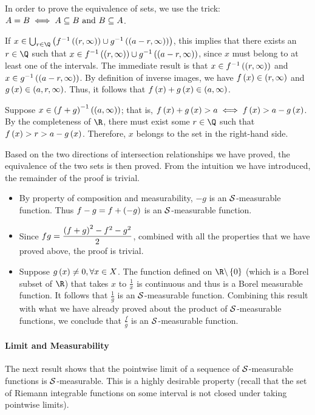 \documentclass[
]{article}
\begin{document}
In order to prove the equivalence of sets, we use the trick:
\(A= B\iff A\se B \text{ and }B\se A\).

If
\(x\in \bigcup_{r\in \Q}\pr{\inv f\pr{\pr{r,\infty}}\cup\inv g\pr{\pr{a-r,\infty}}}\),
this implies that there exists an \(r\in \Q\) such that
\(x\in\inv f\pr{\pr{r,\infty}}\cup\inv g\pr{\pr{a-r,\infty}}\), since
\(x\) must belong to at least one of the intervals. The immediate result
is that \(x\in \inv f\pr{\pr{r,\infty}}\) and
\(x\in \inv g\pr{\pr{a-r,\infty}}\). By definition of inverse images, we
have \(f\pr{x}\in \pr{r,\infty}\) and \(g\pr x\in \pr{a,r,\infty}\).
Thus, it follows that \(f\pr x+g\pr x\in \pr{a,\infty}\).

Suppose \(x\in \pr{f+g}^{-1}\pr{\pr{a,\infty}}\); that is,
\(f\pr x+g\pr x>a\iff f\pr x > a-g\pr x\). By the completeness of
\(\R\), there must exist some \(r\in \Q\) such that
\(f\pr{x}>r>a-g\pr x\). Therefore, \(x\) belongs to the set in the
right-hand side.

Based on the two directions of intersection relationships we have
proved, the equivalence of the two sets is then proved. From the
intuition we have introduced, the remainder of the proof is trivial.

\begin{itemize}
\item
  By property of composition and measurability, \(-g\) is an
  \(\S\)-measurable function. Thus \(f-g = f+\pr{-g}\) is an
  \(\S\)-measurable function.
\item
  Since \(fg = \dfrac{\pr{f+g}^2-f^2-g^2}{2}\), combined with all the
  properties that we have proved above, the proof is trivial.
\item
  Suppose \(g\pr{x}\ne 0,\forall x\in X\). The function defined on
  \(\R\c \brace{0}\) (which is a Borel subset of \(\R\)) that takes
  \(x\) to \(\frac1x\) is continuous and thus is a Borel measurable
  function. It follows that \(\frac1g\) is an \(\S\)-measurable
  function. Combining this result with what we have already proved about
  the product of \(\S\)-measurable functions, we conclude that
  \(\frac{f}{g}\) is an \(\S\)-measurable function.
\end{itemize}

\hypertarget{limit-and-measurability}{%
\paragraph{Limit and Measurability}\label{limit-and-measurability}}

The next result shows that the pointwise limit of a sequence of
\(\S\)-measurable functions is \(\S\)-measurable. This is a highly
desirable property (recall that the set of Riemann integrable functions
on some interval is not closed under taking pointwise limits).
\end{document}
